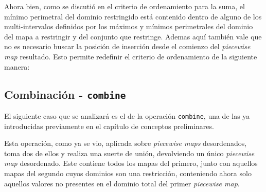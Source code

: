 Ahora bien, como se discutió en el criterio de ordenamiento para la suma, el mínimo perimetral del dominio restringido está contenido dentro de alguno de los multi-intervalos definidos por los máximos y mínimos perimetrales del dominio del mapa a restringir y del conjunto que restringe. Ademas aquí también vale que no es necesario buscar la posición de inserción desde el comienzo del \textit{piecewise map} resultado. Esto permite redefinir el criterio de ordenamiento de la siguiente manera:

\begin{center}
\end{center}


\subsection{Combinación - \texttt{combine}}

El siguiente caso que se analizará es el de la operación \texttt{combine}, una de las ya introducidas previamente en el capítulo de conceptos preliminares.

Esta operación, como ya se vio, aplicada sobre \textit{piecewise maps} desordenados, toma dos de ellos y realiza una suerte de unión, devolviendo un único \textit{piecewise map} desordenado. Este contiene todos los mapas del primero, junto con aquellos mapas del segundo cuyos dominios son una restricción, conteniendo ahora solo aquellos valores no presentes en el dominio total del primer \textit{piecewise map}. 

